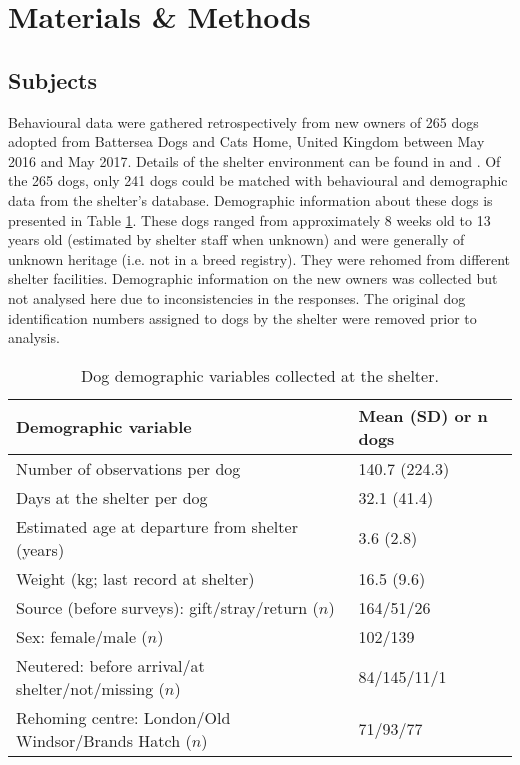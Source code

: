 \documentclass[12pt]{article}
\begin{document}
\section{Materials \& Methods}

\subsection{Subjects}
Behavioural data were gathered retrospectively from new owners of 265 dogs adopted from Battersea Dogs and Cats Home, United Kingdom between May 2016 and May 2017. Details of the shelter environment can be found in \textcite{goold2017aggressiveness} and \textcite{goold2017modelling}. Of the 265 dogs, only 241 dogs could be matched with behavioural and demographic data from the shelter's database. Demographic information about these dogs is presented in Table \ref{table_demoshelter}. These dogs ranged from approximately 8 weeks old to 13 years old (estimated by shelter staff when unknown) and were generally of unknown heritage (i.e. not in a breed registry). They were rehomed from different shelter facilities. Demographic information on the new owners was collected but not analysed here due to inconsistencies in the responses. The original dog identification numbers assigned to dogs by the shelter were removed prior to analysis.

\begin{table}
  \centering
  \begin{tabular}{ll}
  \textbf{Demographic variable} & \textbf{Mean (SD) or $\boldsymbol{n}$ dogs}\\ \hline
  Number of observations per dog & 140.7 (224.3) \\
  Days at the shelter per dog & 32.1 (41.4)\\
  Estimated age at departure from shelter (years) & 3.6 (2.8)\\
  Weight (kg; last record at shelter) & 16.5 (9.6)\\
  Source (before surveys): gift/stray/return ($n$) & 164/51/26\\
  Sex: female/male ($n$) & 102/139\\
  Neutered: before arrival/at shelter/not/missing ($n$) & 84/145/11/1\\
  Rehoming centre: London/Old Windsor/Brands Hatch ($n$) & 71/93/77\\
  \hline
  \end{tabular}
  \caption{Dog demographic variables collected at the shelter.}
  \label{table_demoshelter}
\end{table}
\end{document}
